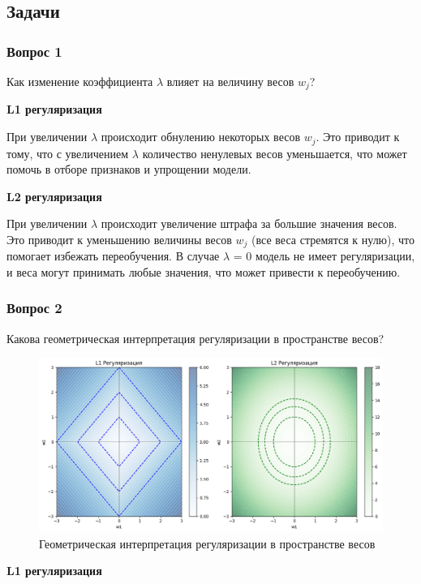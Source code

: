 \subsection {Задачи}
\label{linear-reg-task}


\subsubsection{Вопрос 1}
\noindent Как изменение коэффициента $\lambda$ влияет на величину весов $w_j$?

\textbf{L1 регуляризация}

\noindent При увеличении $\lambda$ происходит обнулению некоторых весов $w_j$. Это приводит к тому, что с увеличением $\lambda$ количество ненулевых весов уменьшается, что может помочь в отборе признаков и упрощении модели.

\textbf{L2 регуляризация}

\noindent При увеличении $\lambda$ происходит увеличение штрафа за большие значения весов. Это приводит к уменьшению величины весов $w_j$ (все веса стремятся к нулю), что помогает избежать переобучения. В случае $\lambda$ = 0 модель не имеет регуляризации, и веса могут принимать любые значения, что может привести к переобучению.

\subsubsection{Вопрос 2}
\noindent Какова геометрическая интерпретация регуляризации в пространстве весов?

\begin{figure}[h]
	\centering
	\includegraphics[width=0.9\linewidth]{chapters/linear/pics/reg-geom.png}
	\caption{Геометрическая интерпретация регуляризации в пространстве весов}
	\label{linear-reg-geom}
\end{figure}

\textbf{L1 регуляризация}

